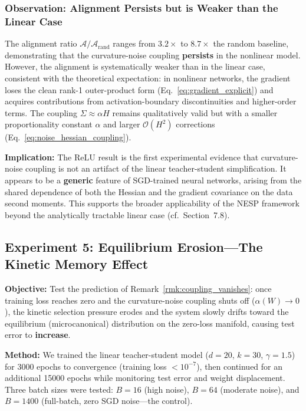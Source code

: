 \documentclass[
  journal=largetwo,
  year=2025,
  volume=37,
]{cup-journal}
\begin{document}
\subsubsection{Observation: Alignment Persists but is Weaker than the Linear Case}

The alignment ratio $\mathcal{A} / \mathcal{A}_{\mathrm{rand}}$ ranges from $3.2\times$ to $8.7\times$ the random baseline, demonstrating that the curvature-noise coupling \textbf{persists} in the nonlinear model. However, the alignment is systematically weaker than in the linear case, consistent with the theoretical expectation: in nonlinear networks, the gradient loses the clean rank-1 outer-product form (Eq.~\ref{eq:gradient_explicit}) and acquires contributions from activation-boundary discontinuities and higher-order terms. The coupling $\Sigma \approx \alpha H$ remains qualitatively valid but with a smaller proportionality constant $\alpha$ and larger $\mathcal{O}(H^2)$ corrections (Eq.~\ref{eq:noise_hessian_coupling}).

\textbf{Implication:} The ReLU result is the first experimental evidence that curvature-noise coupling is not an artifact of the linear teacher-student simplification. It appears to be a \textbf{generic} feature of SGD-trained neural networks, arising from the shared dependence of both the Hessian and the gradient covariance on the data second moments. This supports the broader applicability of the NESP framework beyond the analytically tractable linear case (cf.\ Section~7.8).

\subsection{Experiment 5: Equilibrium Erosion---The Kinetic Memory Effect}

\textbf{Objective:} Test the prediction of Remark~\ref{rmk:coupling_vanishes}: once training loss reaches zero and the curvature-noise coupling shuts off ($\alpha(W) \to 0$), the kinetic selection pressure erodes and the system slowly drifts toward the equilibrium (microcanonical) distribution on the zero-loss manifold, causing test error to \textbf{increase}.

\textbf{Method:} We trained the linear teacher-student model ($d=20$, $k=30$, $\gamma = 1.5$) for 3000 epochs to convergence (training loss $< 10^{-7}$), then continued for an additional 15000 epochs while monitoring test error and weight displacement. Three batch sizes were tested: $B=16$ (high noise), $B=64$ (moderate noise), and $B=1400$ (full-batch, zero SGD noise---the control).
\end{document}
